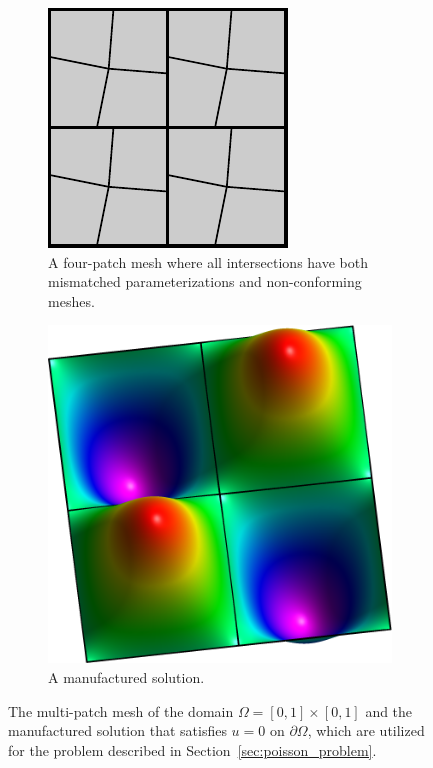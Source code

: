\begin{figure}[ht]
	\center
	\begin{subfigure}[t]{.45\linewidth}
		\center
		\includegraphics[scale=1.35]{four_patches_nonconform_nonmatch}
		\caption{A four-patch mesh where all intersections have both mismatched parameterizations and non-conforming meshes.}\label{fig:Poisson_mesh}
	\end{subfigure}
	\begin{subfigure}[t]{.45\linewidth}
		\center
		\includegraphics[scale=.41]{four_patches_solution-plot}
		\caption{A manufactured solution.}\label{fig:Poisson_manufacture}
	\end{subfigure}
	\caption{The multi-patch mesh of the domain $\Omega=\left[ 0, 1\right]\times \left[ 0, 1\right]$ and the manufactured solution that satisfies $u=0$ on $\partial\Omega$, which are utilized for the problem described in Section~\ref{sec:poisson_problem}.}
\end{figure}


